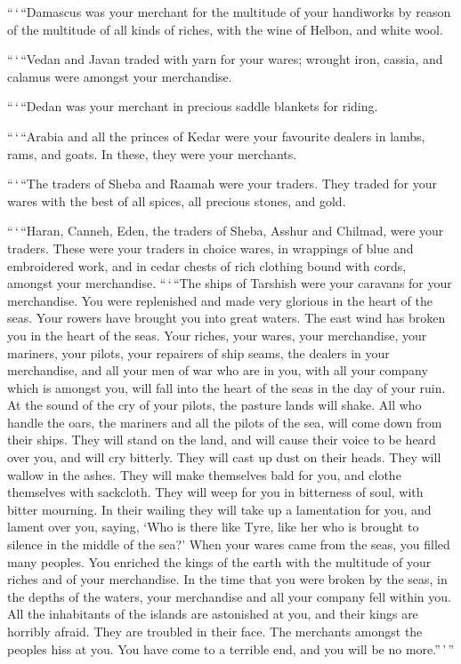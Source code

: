  ``\,`\,``Damascus was your merchant for the multitude of
your handiworks by reason of the multitude of all kinds of riches, with
the wine of Helbon, and white wool.

 ``\,`\,``Vedan and Javan traded with yarn for your
wares; wrought iron, cassia, and calamus were amongst your merchandise.

 ``\,`\,``Dedan was your merchant in precious saddle
blankets for riding.

 ``\,`\,``Arabia and all the princes of Kedar were your
favourite dealers in lambs, rams, and goats. In these, they were your
merchants.

 ``\,`\,``The traders of Sheba and Raamah were your
traders. They traded for your wares with the best of all spices, all
precious stones, and gold.

 ``\,`\,``Haran, Canneh, Eden, the traders of Sheba,
Asshur and Chilmad, were your traders.  These were your
traders in choice wares, in wrappings of blue and embroidered work, and
in cedar chests of rich clothing bound with cords, amongst your
merchandise.  ``\,`\,``The ships of Tarshish were your
caravans for your merchandise. You were replenished and made very
glorious in the heart of the seas.  Your rowers have
brought you into great waters. The east wind has broken you in the heart
of the seas.  Your riches, your wares, your merchandise,
your mariners, your pilots, your repairers of ship seams, the dealers in
your merchandise, and all your men of war who are in you, with all your
company which is amongst you, will fall into the heart of the seas in
the day of your ruin.  At the sound of the cry of your
pilots, the pasture lands will shake.  All who handle the
oars, the mariners and all the pilots of the sea, will come down from
their ships. They will stand on the land,  and will cause
their voice to be heard over you, and will cry bitterly. They will cast
up dust on their heads. They will wallow in the ashes. 
They will make themselves bald for you, and clothe themselves with
sackcloth. They will weep for you in bitterness of soul, with bitter
mourning.  In their wailing they will take up a
lamentation for you, and lament over you, saying, `Who is there like
Tyre, like her who is brought to silence in the middle of the sea?'
 When your wares came from the seas, you filled many
peoples. You enriched the kings of the earth with the multitude of your
riches and of your merchandise.  In the time that you
were broken by the seas, in the depths of the waters, your merchandise
and all your company fell within you.  All the
inhabitants of the islands are astonished at you, and their kings are
horribly afraid. They are troubled in their face.  The
merchants amongst the peoples hiss at you. You have come to a terrible
end, and you will be no more.''\,'\,''

